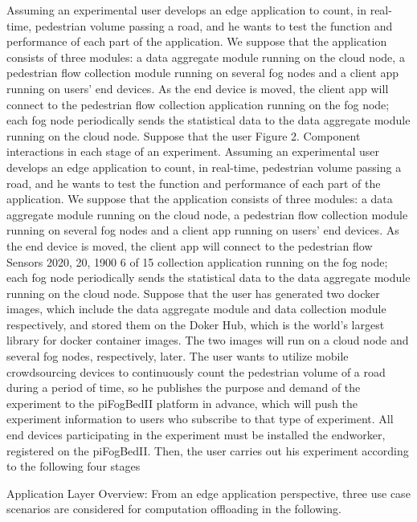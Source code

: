 \documentclass[conference]{IEEEtran}
\begin{document}
Assuming an experimental user develops an edge application to count, in real-time, pedestrian
volume passing a road, and he wants to test the function and performance of each part of the application.
We suppose that the application consists of three modules: a data aggregate module 
running on the cloud node, a pedestrian flow collection module running on several fog nodes and a 
client app running on users' end devices. As the end device is moved, the client app will connect to 
the pedestrian flow collection application running on the fog node; each fog node periodically sends 
the statistical data to the data aggregate module running on the cloud node. Suppose that the user 
Figure 2. Component interactions in each stage of an experiment.
Assuming an experimental user develops an edge application to count, in real-time, pedestrian
volume passing a road, and he wants to test the function and performance of each part of the application.
We suppose that the application consists of three modules: a data aggregate module running on the
cloud node, a pedestrian flow collection module running on several fog nodes and a client app running
on users’ end devices. As the end device is moved, the client app will connect to the pedestrian flow
Sensors 2020, 20, 1900 6 of 15
collection application running on the fog node; each fog node periodically sends the statistical data to
the data aggregate module running on the cloud node. Suppose that the user has generated two docker
images, which include the data aggregate module and data collection module respectively, and stored
them on the Doker Hub, which is the world’s largest library for docker container images. The two
images will run on a cloud node and several fog nodes, respectively, later. The user wants to utilize
mobile crowdsourcing devices to continuously count the pedestrian volume of a road during a period
of time, so he publishes the purpose and demand of the experiment to the piFogBedII platform in
advance, which will push the experiment information to users who subscribe to that type of experiment.
All end devices participating in the experiment must be installed the endworker, registered on the
piFogBedII. Then, the user carries out his experiment according to the following four stages

Application Layer Overview: From an edge application perspective, three use case scenarios are considered for computation offloading in the following.
\end{document}
